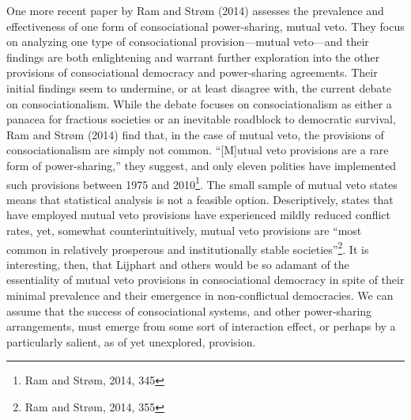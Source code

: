\documentclass[12pt]{article}
\begin{document}
One more recent paper by Ram and Strøm (2014) assesses the prevalence and effectiveness of one form of consociational power-sharing, mutual veto. They focus on analyzing one type of consociational provision---mutual veto---and their findings are both enlightening and warrant further exploration into the other provisions of consociational democracy and power-sharing agreements. Their initial findings seem to undermine, or at least disagree with, the current debate on consociationalism. While the debate focuses on consociationalism as either a panacea for fractious societies or an inevitable roadblock to democratic survival, Ram and Strøm (2014) find that, in the case of mutual veto, the provisions of consociationalism are simply not common. ``[M]utual veto provisions are a rare form of power-sharing,'' they suggest, and only eleven polities have implemented such provisions between 1975 and 2010\footnote{Ram and Strøm, 2014, 345}. The small sample of mutual veto states means that statistical analysis is not a feasible option. Descriptively, states that have employed mutual veto provisions have experienced mildly reduced conflict rates, yet, somewhat counterintuitively, mutual veto provisions are ``most common in relatively prosperous and institutionally stable societies''\footnote{Ram and Strøm, 2014, 355}. It is interesting, then, that Lijphart and others would be so adamant of the essentiality of mutual veto provisions in consociational democracy in spite of their minimal prevalence and their emergence in non-conflictual democracies. We can assume that the success of consociational systems, and other power-sharing arrangements, must emerge from some sort of interaction effect, or perhaps by a particularly salient, as of yet unexplored, provision.
\end{document}
